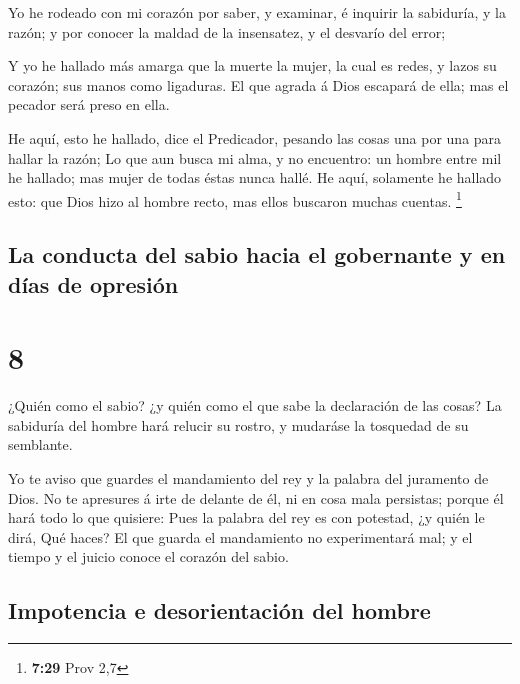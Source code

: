  Yo he rodeado con mi corazón por saber, y examinar, é
inquirir la sabiduría, y la razón; y por conocer la maldad de la
insensatez, y el desvarío del error;

 Y yo he hallado más amarga que la muerte la mujer, la cual
es redes, y lazos su corazón; sus manos como ligaduras. El que agrada á
Dios escapará de ella; mas el pecador será preso en ella.

 He aquí, esto he hallado, dice el Predicador, pesando las
cosas una por una para hallar la razón;  Lo que aun busca
mi alma, y no encuentro: un hombre entre mil he hallado; mas mujer de
todas éstas nunca hallé.  He aquí, solamente he hallado
esto: que Dios hizo al hombre recto, mas ellos buscaron muchas cuentas.
\footnote{\textbf{7:29} Prov 2,7}

\hypertarget{la-conducta-del-sabio-hacia-el-gobernante-y-en-duxedas-de-opresiuxf3n}{%
\subsection{La conducta del sabio hacia el gobernante y en días de
opresión}\label{la-conducta-del-sabio-hacia-el-gobernante-y-en-duxedas-de-opresiuxf3n}}

\hypertarget{section-7}{%
\section{8}\label{section-7}}

 ¿Quién como el sabio? ¿y quién como el que sabe la
declaración de las cosas? La sabiduría del hombre hará relucir su
rostro, y mudaráse la tosquedad de su semblante.

 Yo te aviso que guardes el mandamiento del rey y la palabra
del juramento de Dios.  No te apresures á irte de delante de
él, ni en cosa mala persistas; porque él hará todo lo que quisiere:
 Pues la palabra del rey es con potestad, ¿y quién le dirá,
Qué haces?  El que guarda el mandamiento no experimentará
mal; y el tiempo y el juicio conoce el corazón del sabio.

\hypertarget{impotencia-e-desorientaciuxf3n-del-hombre}{%
\subsection{Impotencia e desorientación del
hombre}\label{impotencia-e-desorientaciuxf3n-del-hombre}}

